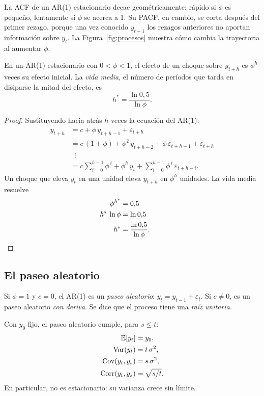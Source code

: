 La ACF de un AR(1) estacionario decae geométricamente: rápido si $\phi$ es pequeño, lentamente si $\phi$ se
acerca a 1. Su PACF, en cambio, se corta después del primer rezago, porque una vez conocido $y_{t-1}$ los
rezagos anteriores no aportan información sobre $y_t$. La Figura~\ref{fig:procesos} muestra cómo cambia la
trayectoria al aumentar $\phi$.

\begin{proposicion}\label{prop:vidamedia}
En un AR(1) estacionario con $0<\phi<1$, el efecto de un choque sobre $y_{t+h}$ es $\phi^h$ veces su efecto
inicial. La \emph{vida media}, el número de períodos que tarda en disiparse la mitad del efecto, es
\[
  h^*=\frac{\ln 0{,}5}{\ln\phi}.
\]
\end{proposicion}

\begin{proof}
Sustituyendo hacia atrás $h$ veces la ecuación del AR(1):
\begin{align*}
  y_{t+h} &= c+\phi\,y_{t+h-1}+\varepsilon_{t+h}\\
          &= c\,(1+\phi)+\phi^2\,y_{t+h-2}+\phi\,\varepsilon_{t+h-1}+\varepsilon_{t+h}\\
          &\;\;\vdots\\
          &= c\sum_{i=0}^{h-1}\phi^{\,i}+\phi^{h}\,y_t+\sum_{i=0}^{h-1}\phi^{\,i}\,\varepsilon_{t+h-i}.
\end{align*}
Un choque que eleva $y_t$ en una unidad eleva $y_{t+h}$ en $\phi^h$ unidades. La vida media resuelve
\begin{align*}
  \phi^{h^*}          &= 0{,}5\\
  h^*\,\ln\phi        &= \ln0{,}5\\
  h^*                 &= \frac{\ln0{,}5}{\ln\phi}. && \qedhere
\end{align*}
\end{proof}

\subsection{El paseo aleatorio}

\begin{definicion}
Si $\phi=1$ y $c=0$, el AR(1) es un \emph{paseo aleatorio}: $y_t=y_{t-1}+\varepsilon_t$. Si $c\ne0$, es un
paseo aleatorio \emph{con deriva}. Se dice que el proceso tiene una \emph{raíz unitaria}.
\end{definicion}

\begin{proposicion}\label{prop:paseo}
Con $y_0$ fijo, el paseo aleatorio cumple, para $s\le t$:
\begin{align*}
  \mathbb{E}[y_t]                       &= y_0,\\
  \operatorname{Var}(y_t)                     &= t\,\sigma^2,\\
  \operatorname{Cov}(y_t,y_s)                 &= s\,\sigma^2,\\
  \operatorname{Corr}(y_t,y_s)  &= \sqrt{s/t}.
\end{align*}
En particular, no es estacionario: su varianza crece sin límite.
\end{proposicion}

